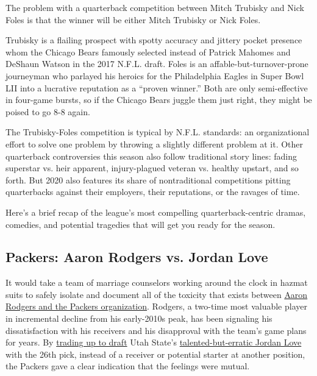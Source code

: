 The problem with a quarterback competition between Mitch Trubisky and
Nick Foles is that the winner will be either Mitch Trubisky or Nick
Foles.

Trubisky is a flailing prospect with spotty accuracy and jittery pocket
presence whom the Chicago Bears famously selected instead of Patrick
Mahomes and DeShaun Watson in the 2017 N.F.L. draft. Foles is an
affable-but-turnover-prone journeyman who parlayed his heroics for the
Philadelphia Eagles in Super Bowl LII into a lucrative reputation as a
``proven winner.'' Both are only semi-effective in four-game bursts, so
if the Chicago Bears juggle them just right, they might be poised to go
8-8 again.

The Trubisky-Foles competition is typical by N.F.L. standards: an
organizational effort to solve one problem by throwing a slightly
different problem at it. Other quarterback controversies this season
also follow traditional story lines: fading superstar vs. heir apparent,
injury-plagued veteran vs. healthy upstart, and so forth. But 2020 also
features its share of nontraditional competitions pitting quarterbacks
against their employers, their reputations, or the ravages of time.

Here's a brief recap of the league's most compelling quarterback-centric
dramas, comedies, and potential tragedies that will get you ready for
the season.

\hypertarget{packers-aaron-rodgers-vs-jordan-love}{%
\subsection{Packers: Aaron Rodgers vs. Jordan
Love}\label{packers-aaron-rodgers-vs-jordan-love}}

It would take a team of marriage counselors working around the clock in
hazmat suits to safely isolate and document all of the toxicity that
exists between
\href{https://www.nytimes3xbfgragh.onion/2019/11/21/sports/football/aaron-rodgers-packers-coach.html}{Aaron
Rodgers and the Packers organization}. Rodgers, a two-time most valuable
player in incremental decline from his early-2010s peak, has been
signaling his dissatisfaction with his receivers and his disapproval
with the team's game plans for years. By
\href{https://www.nytimes3xbfgragh.onion/2020/04/23/sports/football/nfl-draft-live.html}{trading
up to draft} Utah State's
\href{https://www.nytimes3xbfgragh.onion/article/jordan-love.html}{talented-but-erratic
Jordan Love} with the 26th pick, instead of a receiver or potential
starter at another position, the Packers gave a clear indication that
the feelings were mutual.

